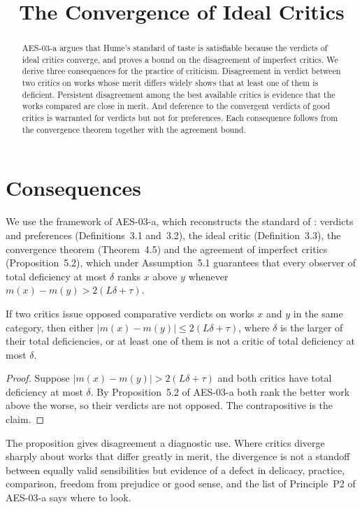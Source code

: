 \documentclass{situationist-preprint}
\title{The Convergence of Ideal Critics}
\begin{document}
\maketitle

\begin{abstract}
AES-03-a argues that Hume's standard of taste is satisfiable because the verdicts of ideal critics converge, and proves a bound on the disagreement of imperfect critics. We derive three consequences for the practice of criticism. Disagreement in verdict between two critics on works whose merit differs widely shows that at least one of them is deficient. Persistent disagreement among the best available critics is evidence that the works compared are close in merit. And deference to the convergent verdicts of good critics is warranted for verdicts but not for preferences. Each consequence follows from the convergence theorem together with the agreement bound.
\end{abstract}

\section{Consequences}

We use the framework of AES-03-a, which reconstructs the standard of \citet{Hume1757}: verdicts and preferences (Definitions~3.1 and~3.2), the ideal critic (Definition~3.3), the convergence theorem (Theorem~4.5) and the agreement of imperfect critics (Proposition~5.2), which under Assumption~5.1 guarantees that every observer of total deficiency at most $\delta$ ranks $x$ above $y$ whenever $m(x)-m(y)>2(L\delta+\tau)$.

\begin{proposition}[Diagnosis]\label{p:diag}
If two critics issue opposed comparative verdicts on works $x$ and $y$ in the same category, then either $|m(x)-m(y)|\le 2(L\delta+\tau)$, where $\delta$ is the larger of their total deficiencies, or at least one of them is not a critic of total deficiency at most $\delta$.
\end{proposition}

\begin{proof}
Suppose $|m(x)-m(y)|>2(L\delta+\tau)$ and both critics have total deficiency at most $\delta$. By Proposition~5.2 of AES-03-a both rank the better work above the worse, so their verdicts are not opposed. The contrapositive is the claim.
\end{proof}

The proposition gives disagreement a diagnostic use. Where critics diverge sharply about works that differ greatly in merit, the divergence is not a standoff between equally valid sensibilities but evidence of a defect in delicacy, practice, comparison, freedom from prejudice or good sense, and the list of Principle~P2 of AES-03-a says where to look.
\end{document}
